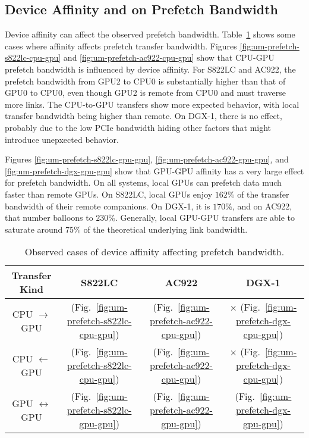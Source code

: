 \subsection{Device Affinity and on Prefetch Bandwidth}

Device affinity can affect the observed prefetch bandwidth.
Table~\ref{tab:um-prefetch-affinity} shows some cases where affinity affects prefetch transfer bandwidth.
Figures \ref{fig:um-prefetch-s822lc-cpu-gpu} and \ref{fig:um-prefetch-ac922-cpu-gpu} show that CPU-GPU prefetch bandwidth is influenced by device affinity.
For S822LC and AC922, the prefetch bandwidth from GPU2 to CPU0 is substantially higher than that of GPU0 to CPU0, even though GPU2 is remote from CPU0 and must traverse more links.
The CPU-to-GPU transfers show more expected behavior, with local transfer bandwidth being higher than remote.
On DGX-1, there is no effect, probably due to the low PCIe bandwidth hiding other factors that might introduce unepxected behavior.

Figures \ref{fig:um-prefetch-s822lc-gpu-gpu}, \ref{fig:um-prefetch-ac922-gpu-gpu}, and \ref{fig:um-prefetch-dgx-gpu-gpu} show that GPU-GPU affinity has a very large effect for prefetch bandwidth.
On all systems, local GPUs can prefetch data much faster than remote GPUs.
On S822LC, local GPUs enjoy $162\%$ of the transfer bandwidth of their remote companions.
On DGX-1, it is $170\%$, and on AC922, that number balloons to $230\%$.
Generally, local GPU-GPU transfers are able to saturate around 75\% of the theoretical underlying link bandwidth.

\begin{table}[ht]
	\centering
	\caption[Device Affinity and prefetch Bandwidth]{
		Observed cases of device affinity affecting prefetch bandwidth.
	}
	\label{tab:um-prefetch-affinity}
	\begin{tabular}{cccc}
		\hline
		\textbf{Transfer Kind}    & \textbf{S822LC}                                        & \textbf{AC922}                                        & \textbf{DGX-1}                                      \\ \hline 
		CPU $\rightarrow$     GPU & \checkmark (Fig.~\ref{fig:um-prefetch-s822lc-cpu-gpu}) & \checkmark (Fig.~\ref{fig:um-prefetch-ac922-cpu-gpu}) & $\times$   (Fig.~\ref{fig:um-prefetch-dgx-cpu-gpu}) \\ \hline
		CPU $\leftarrow$      GPU & \checkmark (Fig.~\ref{fig:um-prefetch-s822lc-cpu-gpu}) & \checkmark (Fig.~\ref{fig:um-prefetch-ac922-cpu-gpu}) & $\times$   (Fig.~\ref{fig:um-prefetch-dgx-cpu-gpu}) \\ \hline
		GPU $\leftrightarrow$ GPU & \checkmark (Fig.~\ref{fig:um-prefetch-s822lc-gpu-gpu}) & \checkmark (Fig.~\ref{fig:um-prefetch-ac922-gpu-gpu}) & \checkmark (Fig.~\ref{fig:um-prefetch-dgx-gpu-gpu}) \\ \hline
	\end{tabular}
\end{table}

